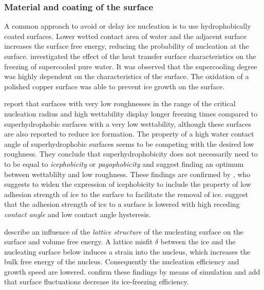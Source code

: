 \subsubsection{Material and coating of the surface}

A common approach to avoid or delay ice nucleation is to use hydrophobically coated surfaces. Lower wetted contact area of water and the adjacent surface increases the surface free energy, reducing the probability of nucleation at the surface. 
\cite{saito_fundamental_1994} investigated the effect of the heat transfer surface characteristics on the freezing of supercooled pure water. It was observed that the supercooling degree was highly dependent on the characteristics of the surface. The oxidation of a polished copper surface was able to prevent ice growth on the surface.

\cite{jung_are_2011} report that surfaces with very low roughnesses in the range of the critical nucleation radius and high wettability display longer freezing times compared to superhydrophobic surfaces with a very low wettability, although these surfaces are also reported to reduce ice formation. The property of a high water contact angle of superhydrophobic surfaces seems to be competing with the desired low roughness. They conclude that superhydrophobicity does not necessarily need to to be equal to \emph{icephobicity} or \emph{pagophobicity} and suggest finding an optimum between wettablilty and low roughness. 
These findings are confirmed by \cite{hejazi_superhydrophobicity_2013}, who suggests to widen the expression of icephobicity to include the property of low adhesion strength of ice to the surface to facilitate the removal of ice. \cite{janjua_performance_2017} suggest that the adhesion strength of ice to a surface is lowered with high receding \emph{contact angle} and low contact angle hysteresis.

\cite{kauffeld_handbooks_2005} describe an influence of the \emph{lattice structure} of the nucleating surface on the surface and volume free energy. A lattice misfit $\delta$ between the ice and the nucleating surface below induces a strain into the nucleus, which increases the bulk free energy of the nucleus. Consequently the nucleation efficiency and growth speed are lowered. \cite{qiu_ice_2017} confirm these findings by means of simulation and add that surface fluctuations decrease its ice-freezing efficiency.  

